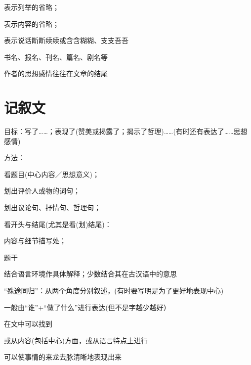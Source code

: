 \begin{asparaenum}[(1)]
\item 表示列举的省略；
\item 表示内容的省略；
\item 表示说话断断续续或含含糊糊、支支吾吾
\end{asparaenum}

书名、报名、刊名、篇名、剧名等

作者的思想感情往往在文章的结尾




\section{记叙文}

目标：写了\ldots{}\ldots{}；表现了(赞美或揭露了；揭示了哲理)\ldots{}\ldots{}(有时还有表达了\ldots{}\ldots{}思想感情)\par
方法：\begin{asparaenum}[(1)]\item 看题目(中心内容／思想意义)；
        \item 划出评价人或物的词句；
        \item 划出议论句、抒情句、哲理句；
        \item 看开头与结尾(尤其是看(划)结尾)：
        \item 内容与细节描写处；
        \item 题干
\end{asparaenum}

结合语言环境作具体解释；少数结合其在古汉语中的意思

``殊途同归''：从两个角度分别叙述，(有时要写明是为了更好地表现中心)

一般由``谁''+``做了什么''进行表达(但不是字越少越好）

在文中可以找到

或从内容(包括中心)方面，或从语言特点上进行

可以使事情的来龙去脉清晰地表现出来

